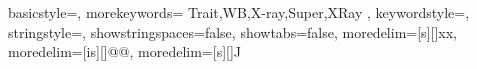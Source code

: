 \usepackage{listings}
\usepackage{subfiles}
\usepackage{textcomp}
\usepackage{xcolor}

{
  basicstyle=\ttfamily,
  morekeywords={
  Trait,WB,X-ray,Super,XRay
  },
  keywordstyle=\color{red},
  stringstyle=\color{red},
  showstringspaces=false,
  showtabs=false,
  moredelim=[s][\color{blue}]{x}{x},
  moredelim=[is][\color{violet}]{@}{@},
  moredelim=[s][\color{gray}]{J}{\ }
}